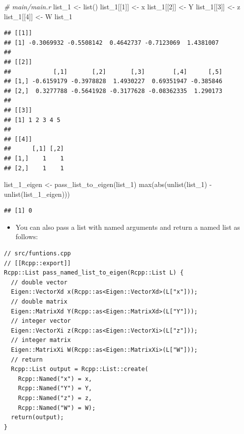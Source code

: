 \documentclass[
]{book}
\newenvironment{Shaded}{\begin{snugshade}}{\end{snugshade}}
\newcommand{\CommentTok}[1]{\textcolor[rgb]{0.56,0.35,0.01}{\textit{#1}}}
\newcommand{\DecValTok}[1]{\textcolor[rgb]{0.00,0.00,0.81}{#1}}
\newcommand{\FunctionTok}[1]{\textcolor[rgb]{0.00,0.00,0.00}{#1}}
\newcommand{\NormalTok}[1]{#1}
\newcommand{\OtherTok}[1]{\textcolor[rgb]{0.56,0.35,0.01}{#1}}
\newcommand{\SpecialCharTok}[1]{\textcolor[rgb]{0.00,0.00,0.00}{#1}}
\providecommand{\tightlist}{%
  \setlength{\itemsep}{0pt}\setlength{\parskip}{0pt}}
\begin{document}
\begin{Shaded}
\begin{Highlighting}[]
\CommentTok{\# main/main.r}
\NormalTok{list\_1 }\OtherTok{\textless{}{-}} \FunctionTok{list}\NormalTok{()}
\NormalTok{list\_1[[}\DecValTok{1}\NormalTok{]] }\OtherTok{\textless{}{-}}\NormalTok{ x}
\NormalTok{list\_1[[}\DecValTok{2}\NormalTok{]] }\OtherTok{\textless{}{-}}\NormalTok{ Y}
\NormalTok{list\_1[[}\DecValTok{3}\NormalTok{]] }\OtherTok{\textless{}{-}}\NormalTok{ z}
\NormalTok{list\_1[[}\DecValTok{4}\NormalTok{]] }\OtherTok{\textless{}{-}}\NormalTok{ W}
\NormalTok{list\_1}
\end{Highlighting}
\end{Shaded}

\begin{verbatim}
## [[1]]
## [1] -0.3069932 -0.5508142  0.4642737 -0.7123069  1.4381007
## 
## [[2]]
##            [,1]       [,2]       [,3]        [,4]      [,5]
## [1,] -0.6159179 -0.3978828  1.4930227  0.69351947 -0.385846
## [2,]  0.3277788 -0.5641928 -0.3177628 -0.08362335  1.290173
## 
## [[3]]
## [1] 1 2 3 4 5
## 
## [[4]]
##      [,1] [,2]
## [1,]    1    1
## [2,]    1    1
\end{verbatim}

\begin{Shaded}
\begin{Highlighting}[]
\NormalTok{list\_1\_eigen }\OtherTok{\textless{}{-}} \FunctionTok{pass\_list\_to\_eigen}\NormalTok{(list\_1)}
\FunctionTok{max}\NormalTok{(}\FunctionTok{abs}\NormalTok{(}\FunctionTok{unlist}\NormalTok{(list\_1) }\SpecialCharTok{{-}} \FunctionTok{unlist}\NormalTok{(list\_1\_eigen)))}
\end{Highlighting}
\end{Shaded}

\begin{verbatim}
## [1] 0
\end{verbatim}

\begin{itemize}
\tightlist
\item
  You can also pass a list with named arguments and return a named list as follows:
\end{itemize}

\begin{verbatim}
// src/funtions.cpp
// [[Rcpp::export]]
Rcpp::List pass_named_list_to_eigen(Rcpp::List L) {
  // double vector
  Eigen::VectorXd x(Rcpp::as<Eigen::VectorXd>(L["x"]));
  // double matrix
  Eigen::MatrixXd Y(Rcpp::as<Eigen::MatrixXd>(L["Y"]));
  // integer vector
  Eigen::VectorXi z(Rcpp::as<Eigen::VectorXi>(L["z"]));
  // integer matrix
  Eigen::MatrixXi W(Rcpp::as<Eigen::MatrixXi>(L["W"]));
  // return
  Rcpp::List output = Rcpp::List::create(
    Rcpp::Named("x") = x, 
    Rcpp::Named("Y") = Y, 
    Rcpp::Named("z") = z, 
    Rcpp::Named("W") = W);
  return(output);
}
\end{verbatim}
\end{document}
